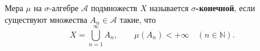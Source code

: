 \label{definition:16}

\begin{definition}
Мера $\mu$ на $\sigma$-алгебре $\mathcal A$ подмножеств $X$ называется \textbf{$\sigma$-конечной}, если существуют множества $A_n\in\mathcal A$ такие, что
\[
  X=\bigcup_{n=1}^{\infty}A_n,
  \qquad \mu(A_n)<+\infty\quad(n\in\mathbb N).
\]
\end{definition}
